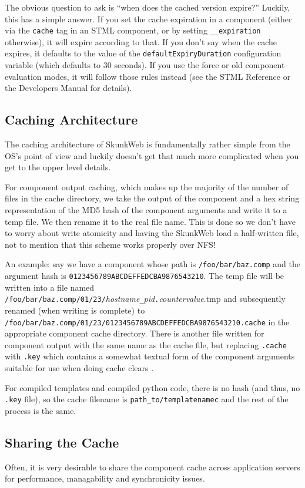 \documentclass[titlepage]{manual}
\begin{document}
The obvious question to ask is ``when does the cached version
expire?''  Luckily, this has a simple answer.  If you set the cache
expiration in a component (either via the \texttt{cache} tag in an
STML component, or by setting \texttt{__expiration} otherwise), it
will expire according to that.  If you don't say when the cache
expires, it defaults to the value of the
\texttt{defaultExpiryDuration} configuration variable (which defaults
to 30 seconds).  If you use the force or old component evaluation
modes, it will follow those rules instead (see the STML Reference or
the Developers Manual for details).

\subsection{Caching Architecture}
The caching architecture of SkunkWeb is fundamentally rather simple
from the OS's point of view and luckily doesn't get that much more
complicated when you get to the upper level details.

For component output caching, which makes up the majority of the
number of files in the cache directory, we take the output of the
component and a hex string representation of the MD5 hash of the
component arguments and write it to a temp file. We then rename it
to the real file name. This is done so we don't have to worry about
write atomicity and having the SkunkWeb load a half-written file,
not to mention that this scheme works properly over NFS!

An example: say we have a component whose path is
\texttt{/foo/bar/baz.comp} and the argument hash is
\texttt{0123456789ABCDEFFEDCBA9876543210}. The temp file will be
written into a file named
\texttt{/foo/bar/baz.comp/01/23/}\emph{hostname}\texttt{\_}\emph{pid}\texttt{.}\emph{countervalue}.tmp
and subsequently renamed (when writing is complete) to
\texttt{/foo/bar/baz.comp/01/23/0123456789ABCDEFFEDCBA9876543210.cache}
in the appropriate component cache directory. There is another file
written for component output with the same name as the cache file, but
replacing \texttt{.cache} with \texttt{.key} which contains a somewhat
textual form of the component arguments suitable for use when doing
cache clears .

For compiled templates and compiled python code, there is no hash (and
thus, no \texttt{.key} file), so the cache filename is
\texttt{path\_to/templatenamec} and the rest of the process is the
same.

\subsection{Sharing the Cache}
Often, it is very desirable to share the component cache across
application servers for performance, managability and synchronicity
issues. 
\end{document}
